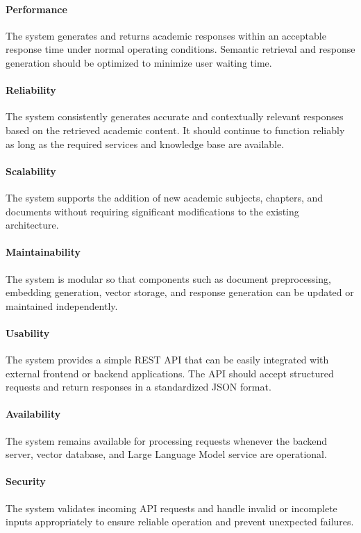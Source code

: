 \paragraph{Performance}  
The system generates and returns academic responses within an acceptable response time under normal operating conditions. Semantic retrieval and response generation should be optimized to minimize user waiting time.

\paragraph{Reliability}  
The system consistently generates accurate and contextually relevant responses based on the retrieved academic content. It should continue to function reliably as long as the required services and knowledge base are available.

\paragraph{Scalability}  
The system supports the addition of new academic subjects, chapters, and documents without requiring significant modifications to the existing architecture.

\paragraph{Maintainability}  
The system is modular so that components such as document preprocessing, embedding generation, vector storage, and response generation can be updated or maintained independently.

\paragraph{Usability}  
The system provides a simple REST API that can be easily integrated with external frontend or backend applications. The API should accept structured requests and return responses in a standardized JSON format.

\paragraph{Availability}  
The system remains available for processing requests whenever the backend server, vector database, and Large Language Model service are operational.

\paragraph{Security}  
The system validates incoming API requests and handle invalid or incomplete inputs appropriately to ensure reliable operation and prevent unexpected failures.


